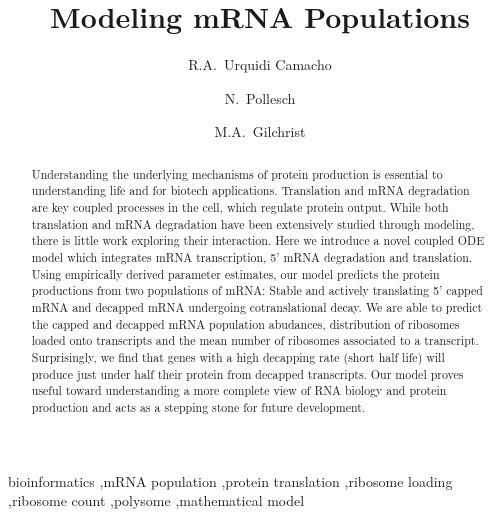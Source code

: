 \documentclass[review]{elsarticle}
\begin{document}
\title{Modeling mRNA Populations}
\author[utkgst]{R.A.~Urquidi Camacho}
\author[utkm,curradd]{N.~Pollesch}
\author[utkgst,utkeeb,nimbios,cor1]{M.A.~Gilchrist}
\address[utkgst]{Genome Science and Technology Program, University of Tennessee, Knoxville, TN 37996-XXX}
\address[utkm]{Department of Mathematics, University of Tennessee,  Knoxville, TN 37996-1320}
\address[utkeeb]{Department of Ecology and Evolutionary Biology, University of Tennessee, Knoxville, TN 37996-1610}
\address[nimbios]{National Institute for Mathematical and Biological Synthesis, University of Tennessee, Knoxville, TN 37996-3410}
\setcounter{page}{68}

\begin{abstract}
Understanding the underlying mechanisms of protein production is essential to understanding life and for biotech applications.
Translation and mRNA degradation are key coupled processes in the cell, which regulate protein output.
While both translation and mRNA degradation have been extensively studied through modeling, there is little work exploring their interaction.
Here we introduce a novel coupled ODE model which integrates mRNA transcription, 5' mRNA degradation and translation.
Using empirically derived parameter estimates, our model predicts the protein productions from two populations of mRNA: Stable and actively translating 5' capped mRNA and decapped mRNA undergoing cotranslational decay.
We are able to predict the capped and decapped mRNA population abudances, distribution of ribosomes loaded onto transcripts and the mean number of ribosomes associated to a transcript.
Surprisingly, we find that genes with a high decapping rate (short half life) will produce just under half their protein from decapped transcripts.
Our model proves useful toward understanding a more complete view of RNA biology and protein production and acts as a stepping stone for future development. %
 
\end{abstract}
\begin{keyword}
bioinformatics \sep mRNA population \sep protein translation \sep ribosome loading \sep ribosome count \sep polysome \sep mathematical model
\end{keyword}
\maketitle
\newpage
\end{document}

